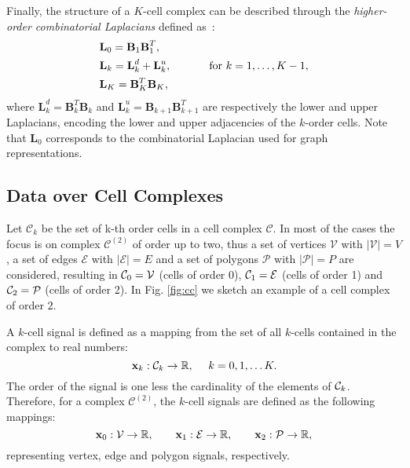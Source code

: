 \documentclass{article}
\def\mB{{\bm{B}}}
\def\mL{{\bm{L}}}
\def\mB{\mbox{$\mathbf{B}$}}
\def\mL{\mbox{$\mathbf{L}$}}
\begin{document}
Finally, the structure of a $K$-cell complex can be described through the {\it higher-order combinatorial Laplacians} defined as~\cite{eckmann1944harmonische, Lim}: 
\begin{align}
    &\mL_0=\mB_1\mB_1^T, \nonumber\\
    &\mL_k=  \mL_{k}^{d}+\mL_{k}^{u} ,\;\;\qquad \hbox{$\;\;$ for $k=1,\ldots,K-1$,} \nonumber\\
    &\mL_K=\mB_K^T\mB_K,
\end{align}
where $\mL_{k}^{d} =\mB_{k}^T \mB_{k}$ and  $\mL_{k}^{u} =\mB_{k+1} \mB_{k+1}^T$ are respectively the lower and upper Laplacians, encoding the lower and upper adjacencies  of the $k$-order cells.
Note that  $\mathbf{L}_{0}$  corresponds to the combinatorial Laplacian used for graph representations.








\subsection{Data over Cell Complexes}

Let $\mathcal{C}_k$ be the set of k-th order cells in a cell complex $\mathcal{C}$. In most of the cases the focus is on complex $\mathcal{C}^{(2)}$ of order up to two, thus a set of vertices $\mathcal{V}$ with $|\mathcal{V}| = V$, a set of edges $\mathcal{E}$ with $|\mathcal{E}|=E$ and a set of polygons $\mathcal{P}$ with $|\mathcal{P}| = P$ are considered, resulting in ${\cal C}_{0}={\cal V}$ (cells of order 0), ${\cal C}_{1}={\cal E}$ (cells of order 1) and ${\cal C}_{2}={\cal P}$ (cells of order 2). In Fig. \ref{fig:cc} we sketch an example of a cell complex of order $2$.

A $k$-cell signal is defined as a mapping from the set of all $k$-cells contained in the complex to real numbers:
\begin{equation} \label{gen_sig}
\mathbf{x}_{k}: {\cal C}_{k} \rightarrow \mathbb{R}, \,\,\quad k=0, 1, \ldots K.
\end{equation}
The order of the signal is one less the cardinality of the elements of ${\cal C}_{k}$. Therefore, for a complex $\mathcal{C}^{(2)}$, the $k$-cell signals are defined as the following mappings: 
\begin{equation}
\mathbf{x}_{0}: {\cal V} \rightarrow \mathbb{R} , \qquad \mathbf{x}_{1}: {\cal E} \rightarrow \mathbb{R} , \qquad \mathbf{x}_{2}: {\cal P} \rightarrow \mathbb{R} ,
\end{equation}
representing vertex, edge and polygon signals, respectively. 
\end{document}
